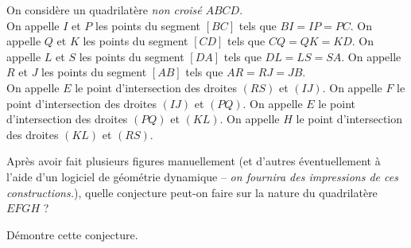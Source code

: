 On considère un quadrilatère {\em non croisé} $ABCD$.\\ On appelle $I$
et $P$ les points du segment $[BC]$ tels que $BI=IP=PC$. On appelle $Q$
et $K$ les points du segment $[CD]$ tels que $CQ=QK=KD$. On appelle $L$
et $S$ les points du segment $[DA]$ tels que $DL=LS=SA$. On appelle $R$
et $J$ les points du segment $[AB]$ tels que $AR=RJ=JB$.
\\On appelle $E$ le point d'intersection des droites $(RS)$ et
$(IJ)$. On appelle $F$ le point d'intersection des droites $(IJ)$ et
$(PQ)$. On appelle $E$ le point d'intersection des droites $(PQ)$ et
$(KL)$. On appelle $H$ le point d'intersection des droites $(KL)$ et
$(RS)$.
\begin{myenumerate}
  \item Après avoir fait plusieurs figures manuellement (et d'autres
    éventuellement à l'aide d'un logiciel de géométrie dynamique --
    {\em on fournira des impressions de ces constructions.}), quelle
    conjecture peut-on faire sur la nature du quadrilatère $EFGH$ ?
  \item Démontre cette conjecture.
\end{myenumerate}
